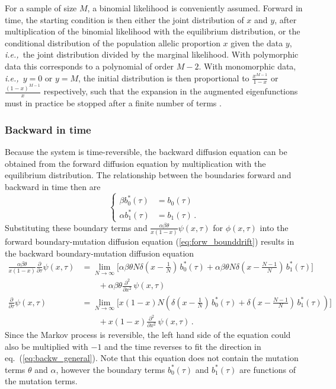 \documentclass[preprint]{elsarticle}
\newcommand\ie{{\it i.e.,}}
\begin{document}
For a sample of size $M$, a binomial likelihood is conveniently assumed. Forward in time, the starting condition is then either the joint distribution of $x$ and $y$, after multiplication of the binomial likelihood with the equilibrium distribution, or the conditional distribution of the population allelic proportion $x$ given the data $y$, \ie\ the joint distribution divided by the marginal likelihood. With polymorphic data this corresponds to a polynomial of order $M-2$. With monomorphic data, \ie\ $y=0$ or $y=M$, the initial distribution is then proportional to $\frac{x^{M-1}}{1-x}$ or $\frac{(1-x)^{M-1}}{x}$ respectively, such that the expansion in the augmented eigenfunctions must in practice be stopped after a finite number of terms \citep{Vogl16}.

\subsubsection{Backward in time}

Because the system is time-reversible, the backward diffusion equation can be obtained from the forward diffusion equation by multiplication with the equilibrium distribution. The relationship between the boundaries forward and backward in time then are
\begin{equation}
\begin{cases}
\beta b_0^{*}(\tau)&= b_0(\tau)\\ 
\alpha b_1^{*}(\tau)&=b_1(\tau)\,.
\end{cases}
\end{equation}
Substituting these boundary terms and  $\tfrac{\alpha\beta\theta}{x(1-x)}\psi(x,\tau)$ for $\phi(x,\tau)$ into the forward boundary-mutation diffusion equation (\ref{eq:forw_bounddrift}) results in the backward boundary-mutation diffusion equation
\begin{equation}\label{eq:back_bounddrift}
\begin{split}
\frac{\alpha\beta\theta}{x(1-x)}\frac{\partial}{\partial \tau} \psi(x,\tau)&=
     \lim_{N\to\infty}\bigg[{\alpha\beta\theta}N\delta(x-\tfrac1N)\,b_0^{*}(\tau)  
    +{\alpha\beta\theta}N\delta(x-\tfrac{N-1}N) \,b_1^{*}(\tau)\bigg]\\
    &\qquad+{\alpha\beta\theta}\frac{\partial^2}{\partial x^2}\,\psi(x,\tau)\\
\frac{\partial}{\partial \tau} \psi(x,\tau)&=
     \lim_{N\to\infty}\bigg[x(1-x)N(\delta(x-\tfrac1N)\,b_0^{*}(\tau) +\delta(x-\tfrac{N-1}N) \,b_1^{*}(\tau))\bigg]\\
    &\qquad+x(1-x)\frac{\partial^2}{\partial x^2}\,\psi(x,\tau)\,.
\end{split}
\end{equation}
Since the Markov process is reversible, the left hand side of the equation could also be multiplied with $-1$ and the time reverses to fit the direction in eq.~(\ref{eq:backw_general}). Note that this equation does not contain the mutation terms $\theta$ and $\alpha$, however the boundary terms $b_0^{*}(\tau)$ and $b_1^{*}(\tau)$ are functions of the mutation terms. 
\end{document}
